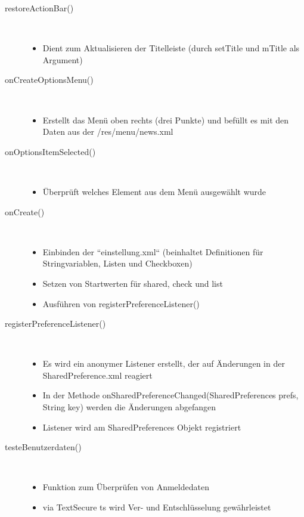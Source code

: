 \begin{description}
 
\item[restoreActionBar()]~\par
\begin{itemize}
\item Dient zum Aktualisieren der Titelleiste (durch setTitle und mTitle als Argument)
\end{itemize}

 
\item[onCreateOptionsMenu()]~\par
\begin{itemize}
\item Erstellt das Menü oben rechts (drei Punkte) und befüllt es mit den Daten aus der /res/menu/news.xml
\end{itemize}

 
\item[onOptionsItemSelected()]~\par
\begin{itemize}
\item Überprüft welches Element aus dem Menü ausgewählt wurde
\end{itemize}


 
\item[onCreate()]~\par
\begin{itemize}
\item Einbinden der “einstellung.xml“ (beinhaltet Definitionen für Stringvariablen, Listen und Checkboxen)
\item Setzen von Startwerten für shared, check und list
\item Ausführen von registerPreferenceListener()
\end{itemize}


\item[registerPreferenceListener()]~\par
\begin{itemize}
\item Es wird ein anonymer Listener erstellt, der auf Änderungen in der SharedPreference.xml reagiert
\item In der Methode onSharedPreferenceChanged(SharedPreferences prefs, String key) werden die Änderungen abgefangen
\item Listener wird am SharedPreferences Objekt  registriert
\end{itemize}

\item[testeBenutzerdaten()]~\par
\begin{itemize}
\item Funktion zum Überprüfen von Anmeldedaten
\item via TextSecure ts wird Ver- und Entschlüsselung gewährleistet
\end{itemize}



\end{description}
